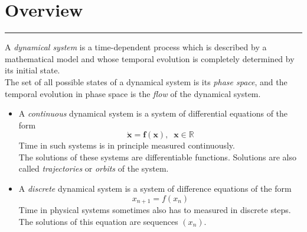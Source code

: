 \section{Overview}
\noindent\rule[\linienAbstand]{\linewidth}{\linienDickeDick}
A \emph{dynamical system} is a time-dependent process which is described by a mathematical model and whose temporal evolution is completely determined by its initial state.\\
The set of all possible states of a dynamical system is its \emph{phase space}, and the temporal evolution in phase space is the \emph{flow} of the dynamical system.
\begin{itemize}
  \item A \emph{continuous} dynamical system is a system of differential equations of the form
  \begin{equation}
    \dot{\mathbf{x}} = \mathbf{f}(\mathbf{x}), \;\; \mathbf{x} \in \mathbb{R}
  \end{equation}
  Time in such systems is in principle measured continuously.\\
  The solutions of these systems are differentiable functions. Solutions are also called \emph{trajectories} or \emph{orbits} of the system.

  \item A \emph{discrete} dynamical system is a system of difference equations of the form
  \begin{equation}
    x_{n + 1} = f(x_n)
  \end{equation}
  Time in physical systems sometimes also has to measured in discrete steps.\\
  The solutions of this equation are sequences $(x_n)$.
\end{itemize}
